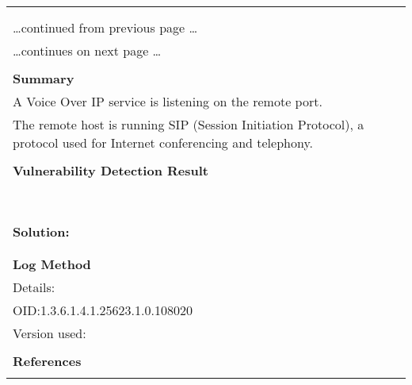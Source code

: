 \documentclass{article}
\begin{document}
\begin{longtable}{|p{}|}
\hline
\rowcolor{gvm_log}{\color{white}{Log (CVSS: 0.0) }}\\
\rowcolor{gvm_log}{\color{white}{NVT: Detect SIP Compatible Hosts (TCP)}}\\
\hline
\endfirsthead
\hfill\ldots continued from previous page \ldots \\
\hline
\endhead
\hline
\ldots continues on next page \ldots \\
\endfoot
\hline
\endlastfoot
\\
\textbf{Summary}\\
A Voice Over IP service is listening on the remote port.\\
  The remote host is running SIP (Session Initiation Protocol), a protocol
  used for Internet conferencing and telephony.\\

        \hline
        \\
\textbf{Vulnerability Detection Result}\\
\rowcolor{white}{\verb=User-Agent: FRITZ!OS=}\\
\rowcolor{white}{\verb=Full banner output:=}\\
\rowcolor{white}{\verb=SIP/2.0 400 Illegal request line=}\\
\rowcolor{white}{\verb=From: <sip:missing>=}\\
\rowcolor{white}{\verb=To: <sip:missing>;tag=\verb-=-\verb=badrequest=}\\
\rowcolor{white}{\verb=User-Agent: FRITZ!OS=}\\
\rowcolor{white}{\verb=Content-Length: 0=}\\

          \hline
          \\
\textbf{Solution:}\\
\\


        \hline
        \\
\textbf{Log Method}\\
Details:
\rowcolor{white}{\verb=Detect SIP Compatible Hosts (TCP)=}\\
OID:1.3.6.1.4.1.25623.1.0.108020\\
Version used:
\rowcolor{white}{\verb=2020-11-10T15:30:28Z=}\\

      \hline
      \\
\textbf{References}\\
\rowcolor{white}{\verb=url: http://www.cs.columbia.edu/sip/=}\\
\end{longtable}
\end{document}
